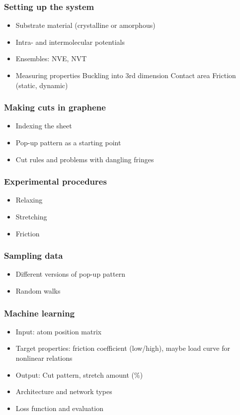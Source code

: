 \documentclass[UKenglish]{book}
\begin{document}
\subsubsection*{Setting up the system}
\begin{itemize}
  \item Substrate material (crystalline or amorphous)
  \item Intra- and intermolecular potentials
  \item Ensembles: NVE, NVT
  \item Measuring properties
  \subitem Buckling into 3rd dimension 
  \subitem Contact area
  \subitem Friction (static, dynamic)
\end{itemize}

\subsubsection*{Making cuts in graphene}
\begin{itemize}
  \item Indexing the sheet
  \item Pop-up pattern as a starting point
  \item Cut rules and problems with dangling fringes 
\end{itemize}

\subsubsection*{Experimental procedures}
\begin{itemize}
  \item Relaxing
  \item Stretching 
  \item Friction 
\end{itemize}

\subsubsection*{Sampling data}
\begin{itemize}
  \item Different versions of pop-up pattern 
  \item Random walks 
\end{itemize}

\subsubsection*{Machine learning}
\begin{itemize}
  \item Input: atom position matrix
  \item Target properties: friction coefficient (low/high), maybe load curve for nonlinear relations
  \item Output: Cut pattern, stretch amount (\%)
  \item Architecture and network types
  \item Loss function and evaluation
\end{itemize}
\end{document}
